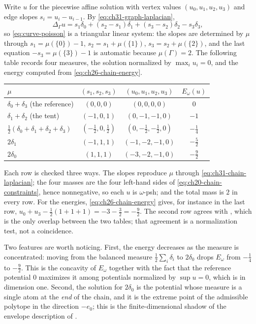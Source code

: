 \begin{example}
Write \(u\) for the piecewise affine solution with vertex values
\((u_0,u_1,u_2,u_3)\) and edge slopes \(s_i=u_i-u_{i-1}\).  By
\eqref{eq:ch31-graph-laplacian},
\begin{equation}
\label{eq:ch31-chain-laplacian}
 \Delta_\Gamma u
 =s_1\delta_0+(s_2-s_1)\delta_1+(s_3-s_2)\delta_2-s_3\delta_3 ,
\end{equation}
so \eqref{eq:curve-poisson} is a triangular linear system: the slopes are
determined by \(\mu\) through
\(s_1=\mu(\{0\})-1\), \(s_2=s_1+\mu(\{1\})\), \(s_3=s_2+\mu(\{2\})\), and
the last equation \(-s_3=\mu(\{3\})-1\) is automatic because
\(\mu(\Gamma)=2\).  The following table records four measures, the solution
normalized by \(\max_iu_i=0\), and the energy computed from
\eqref{eq:ch26-chain-energy}.
\begin{center}
\small
\begin{tabular}{l|c|c|c}
\toprule
\(\mu\)&\((s_1,s_2,s_3)\)&\((u_0,u_1,u_2,u_3)\)&\(E_\omega(u)\)\\
\midrule
\(\delta_0+\delta_3\) (the reference)&\((0,0,0)\)&\((0,0,0,0)\)&\(0\)\\
\(\delta_1+\delta_2\) (the tent)&\((-1,0,1)\)&\((0,-1,-1,0)\)&\(-1\)\\
\(\tfrac12(\delta_0+\delta_1+\delta_2+\delta_3)\)
 &\((-\tfrac12,0,\tfrac12)\)&\((0,-\tfrac12,-\tfrac12,0)\)
 &\(-\tfrac14\)\\
\(2\delta_1\)&\((-1,1,1)\)&\((-1,-2,-1,0)\)&\(-\tfrac52\)\\
\(2\delta_0\)&\((1,1,1)\)&\((-3,-2,-1,0)\)&\(-\tfrac92\)\\
\bottomrule
\end{tabular}
\end{center}
Each row is checked three ways.  The slopes reproduce \(\mu\) through
\eqref{eq:ch31-chain-laplacian}; the four masses are the four left-hand
sides of \eqref{eq:ch20-chain-constraints}, hence nonnegative, so each
\(u\) is \(\omega\)-psh; and the total mass is \(2\) in every row.  For the
energies, \eqref{eq:ch26-chain-energy} gives, for instance in the last row,
\(u_0+u_3-\tfrac12(1+1+1)=-3-\tfrac32=-\tfrac92\).  The second row agrees
with , which is the only overlap between the two
tables; that agreement is a normalization test, not a coincidence.

Two features are worth noticing.  First, the energy decreases as the measure
is concentrated: moving from the balanced measure
\(\tfrac12\sum_i\delta_i\) to \(2\delta_0\) drops \(E_\omega\) from
\(-\tfrac14\) to \(-\tfrac92\).  This is the concavity of \(E_\omega\)
together with the fact that the reference potential \(0\) maximizes it among
potentials normalized by \(\sup u=0\), which is
 in dimension one.  Second, the solution
for \(2\delta_0\) is the potential whose measure is a single atom at the
\emph{end} of the chain, and it is the extreme point of the admissible
polytope in the direction \(-e_0\); this is the finite-dimensional shadow of
the envelope description of .
\end{example}

